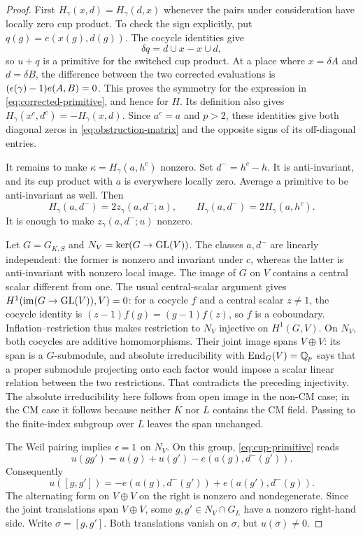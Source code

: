 \begin{proof}
First $H_\gamma(x,d)=H_\gamma(d,x)$ whenever the pairs under
consideration have locally zero cup product.  To check the sign
explicitly, put $q(g)=e(x(g),d(g))$.  The cocycle identities give
\[
 \delta q=d\cup x-x\cup d,
\]
so $u+q$ is a primitive for the switched cup product.  At a place
where $x=\delta A$ and $d=\delta B$, the difference between the two
corrected evaluations is
$(\epsilon(\gamma)-1)e(A,B)=0$.  This proves the symmetry for the
expression in \cref{eq:corrected-primitive}, and hence for $H$.
Its definition also gives
$H_\gamma(x^c,d^c)=-H_\gamma(x,d)$.  Since $a^c=a$ and $p>2$,
these identities give both diagonal zeros in
\cref{eq:obstruction-matrix} and the opposite signs of its
off-diagonal entries.

It remains to make $\kappa=H_\gamma(a,h^c)$ nonzero.  Set
$d^-=h^c-h$.  It is anti-invariant, and its cup product with $a$
is everywhere locally zero.  Average a primitive to be
anti-invariant as well.  Then
\[
 H_\gamma(a,d^-)=2z_\gamma(a,d^-;u),\qquad
 H_\gamma(a,d^-)=2H_\gamma(a,h^c).
\]
It is enough to make $z_\gamma(a,d^-;u)$ nonzero.

Let $G=G_{K,S}$ and $N_V=\ker(G\to\operatorname{GL}(V))$.  The classes $a,d^-$
are linearly independent: the former is nonzero and invariant
under $c$, whereas the latter is anti-invariant with nonzero local
image.  The image of $G$ on $V$ contains a central scalar different
from one.  The usual central-scalar argument gives
$H^1(\operatorname{im}(G\to\operatorname{GL}(V)),V)=0$: for a cocycle $f$ and a central
scalar $z\ne1$, the cocycle identity is
$(z-1)f(g)=(g-1)f(z)$, so $f$ is a coboundary.
Inflation--restriction thus makes restriction to
$N_V$ injective on $H^1(G,V)$.  On $N_V$, both cocycles are additive
homomorphisms.  Their joint image spans $V\oplus V$: its span is a
$G$-submodule, and absolute irreducibility with
$\operatorname{End}_G(V)=\mathbb Q_p$ says that a proper submodule projecting onto each
factor would impose a scalar linear relation between the two
restrictions.  That contradicts the preceding injectivity.
The absolute irreducibility here follows from open image in the
non-CM case; in the CM case it follows because neither $K$ nor $L$
contains the CM field.  Passing to the finite-index subgroup over
$L$ leaves the span unchanged.

The Weil pairing implies $\epsilon=1$ on $N_V$.  On this group,
\cref{eq:cup-primitive} reads
\[
 u(gg')=u(g)+u(g')-e(a(g),d^-(g')).
\]
Consequently
\begin{equation}\label{eq:heisenberg-commutator}
 u([g,g'])=-e(a(g),d^-(g'))+e(a(g'),d^-(g)).
\end{equation}
The alternating form on $V\oplus V$ on the right is nonzero and
nondegenerate.  Since the joint translations span $V\oplus V$,
some $g,g'\in N_V\cap G_L$ have a nonzero right-hand side.
Write $\sigma=[g,g']$.  Both translations vanish on $\sigma$, but
$u(\sigma)\ne0$.


\end{proof}
